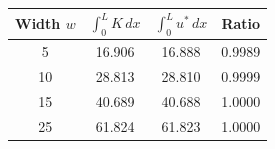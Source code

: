 \begin{tabular}{cccc}
\toprule
Width $w$ & $\int_0^L K\,dx$ & $\int_0^L u^*\,dx$ & Ratio \\
\midrule
5 & 16.906 & 16.888 & 0.9989 \\
10 & 28.813 & 28.810 & 0.9999 \\
15 & 40.689 & 40.688 & 1.0000 \\
25 & 61.824 & 61.823 & 1.0000 \\
\bottomrule
\end{tabular}
